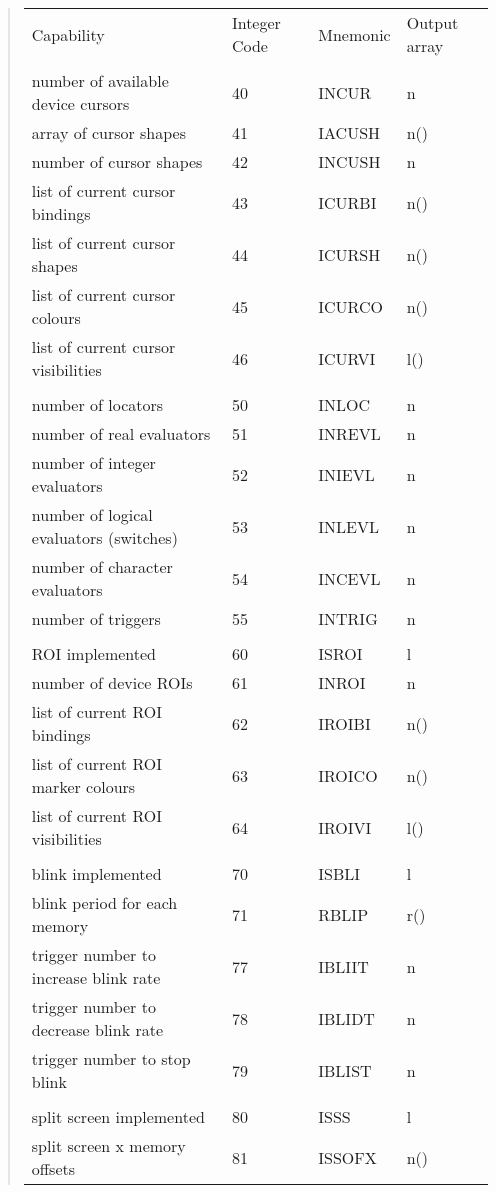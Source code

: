 \begin{quote}
\begin{tabular}{llll}
Capability & Integer Code & Mnemonic & Output array \\
\\
number of available device cursors & 40 & INCUR & n \\
array of cursor shapes & 41 & IACUSH & n() \\
number of cursor shapes & 42 & INCUSH & n \\
list of current cursor bindings & 43 & ICURBI & n() \\
list of current cursor shapes & 44 & ICURSH & n() \\
list of current cursor colours & 45 & ICURCO & n() \\
list of current cursor visibilities & 46 & ICURVI & l() \\
\\
number of locators & 50 & INLOC & n \\
number of real evaluators & 51 & INREVL & n \\
number of integer evaluators & 52 & INIEVL & n \\
number of logical evaluators (switches) & 53 & INLEVL & n \\
number of character evaluators & 54 & INCEVL & n \\
number of triggers & 55 & INTRIG & n \\
\\
ROI implemented & 60 & ISROI & l \\
number of device ROIs & 61 & INROI & n \\
list of current ROI bindings & 62 & IROIBI & n() \\
list of current ROI marker colours & 63 & IROICO & n() \\
list of current ROI visibilities & 64 & IROIVI & l() \\
\\
blink implemented & 70 & ISBLI & l \\
blink period for each memory & 71 & RBLIP & r() \\
trigger number to increase blink rate & 77 & IBLIIT & n \\
trigger number to decrease blink rate & 78 & IBLIDT & n \\
trigger number to stop blink & 79 & IBLIST & n \\
\\
split screen implemented & 80 & ISSS & l \\
split screen x memory offsets & 81 & ISSOFX & n() \\

\end{tabular}
\end{quote}
